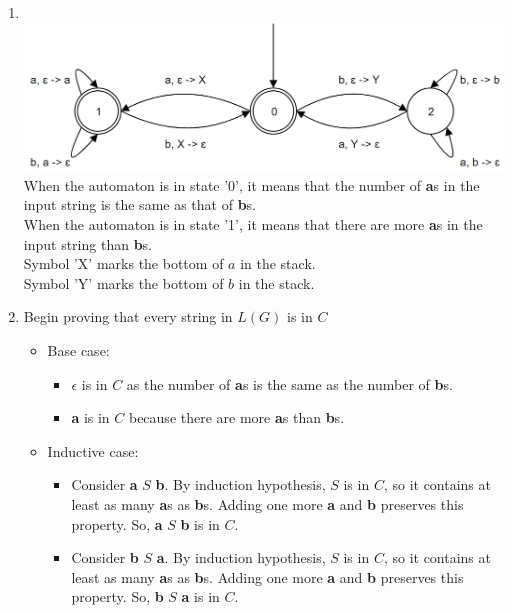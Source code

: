 \documentclass{article}
\begin{document}
\begin{enumerate}

    \item
    \hspace{1pt}\\
    \includegraphics[width=15cm]{a2}
    When the automaton is in state '0', it means that the number of \textbf{a}s in the input string is the same as that of \textbf{b}s.\\
    When the automaton is in state '1', it means that there are more \textbf{a}s in the input string than \textbf{b}s.\\
    Symbol 'X' marks the bottom of $a$ in the stack.\\
    Symbol 'Y' marks the bottom of $b$ in the stack.
    \item
    Begin proving that every string in $L(G)$ is in $C$
        \begin{itemize}
            \item
            Base case:
            \begin{itemize}
                \item
                $\epsilon$ is in $C$ as the number of \textbf{a}s is the same as the number of \textbf{b}s.
                
                \item
                \textbf{a} is in $C$ because there are more \textbf{a}s than \textbf{b}s.
            \end{itemize}
            
            \item
            Inductive case:
            \begin{itemize}
                \item
                Consider \textbf{a} $S$ \textbf{b}. By induction hypothesis, $S$ is in $C$, so it contains at least as many \textbf{a}s as \textbf{b}s. Adding one more \textbf{a} and \textbf{b} preserves this property. So, \textbf{a} $S$ \textbf{b} is in $C$.
                
                \item
                Consider \textbf{b} $S$ \textbf{a}. By induction hypothesis, $S$ is in $C$, so it contains at least as many \textbf{a}s as \textbf{b}s. Adding one more \textbf{a} and \textbf{b} preserves this property. So, \textbf{b} $S$ \textbf{a} is in $C$.
                

\end{itemize}
\end{itemize}
\end{enumerate}
\end{document}
